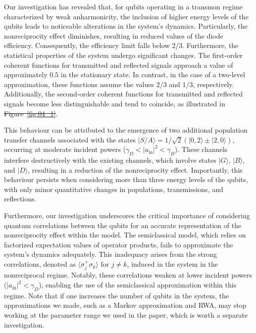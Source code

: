 \documentclass[lettersize,journal]{IEEEtran}
\providecommand{\DIFaddtex}[1]{{\protect\color{blue}\uwave{#1}}} %
\providecommand{\DIFdeltex}[1]{{\protect\color{red}\sout{#1}}}                      %
\providecommand{\DIFaddbegin}{} %
\providecommand{\DIFaddend}{} %
\providecommand{\DIFdelbegin}{} %
\providecommand{\DIFdelend}{} %
\providecommand{\DIFadd}[1]{\texorpdfstring{\DIFaddtex{#1}}{#1}} %
\providecommand{\DIFdel}[1]{\texorpdfstring{\DIFdeltex{#1}}{}} %
\newcommand{\DIFscaledelfig}{0.5}
\newlength{\DIFdelgraphicswidth} %
\newlength{\DIFdelgraphicsheight} %
\newcommand{\DIFaddincludegraphics}[2][]{{\color{blue}\fbox{\DIFOincludegraphics[#1]{#2}}}} %
\newcommand{\DIFdelincludegraphics}[2][]{%
\sbox{\DIFdelgraphicsbox}{\DIFOincludegraphics[#1]{#2}}%
\settoboxwidth{\DIFdelgraphicswidth}{\DIFdelgraphicsbox} %
\settoboxtotalheight{\DIFdelgraphicsheight}{\DIFdelgraphicsbox} %
\scalebox{\DIFscaledelfig}{%
\parbox[b]{\DIFdelgraphicswidth}{\usebox{\DIFdelgraphicsbox}\\[-\baselineskip] \rule{\DIFdelgraphicswidth}{0em}}\llap{\resizebox{\DIFdelgraphicswidth}{\DIFdelgraphicsheight}{%
\setlength{\unitlength}{\DIFdelgraphicswidth}%
\begin{picture}(1,1)%
\thicklines\linethickness{2pt} %
{\color[rgb]{1,0,0}\put(0,0){\framebox(1,1){}}}%
{\color[rgb]{1,0,0}\put(0,0){\line( 1,1){1}}}%
{\color[rgb]{1,0,0}\put(0,1){\line(1,-1){1}}}%
\end{picture}%
}\hspace*{3pt}}} %
} %
\DeclareRobustCommand{\DIFaddbegin}{\DIFOaddbegin \let\includegraphics\DIFaddincludegraphics} %
\DeclareRobustCommand{\DIFaddend}{\DIFOaddend \let\includegraphics\DIFOincludegraphics} %
\DeclareRobustCommand{\DIFdelbegin}{\DIFOdelbegin \let\includegraphics\DIFdelincludegraphics} %
\DeclareRobustCommand{\DIFdelend}{\DIFOaddend \let\includegraphics\DIFOincludegraphics} %
\begin{document}
Our investigation has revealed that, for qubits operating in a transmon regime characterized by weak anharmonicity, the inclusion of higher energy levels of the qubits leads to noticeable alterations in the system's dynamics. 
Particularly, the nonreciprocity effect diminishes, resulting in reduced values of the diode efficiency. 
Consequently, the efficiency limit falls below $2/3$. 
Furthermore, the statistical properties of the system undergo significant changes. 
The first-order coherent functions for transmitted and reflected signals approach a value of approximately $0.5$ in the stationary state. 
In contrast, in the case of a two-level approximation, these functions assume the values $2/3$ and $1/3$, respectively. 
Additionally, the second-order coherent functions for transmitted and reflected signals become less distinguishable and tend to coincide, as illustrated in \DIFdelbegin \DIFdel{Figure~\ref{fig:04_1}}\DIFdelend \DIFaddbegin \DIFadd{Fig.~\ref{fig:06}}\DIFaddend .

This behaviour can be attributed to the emergence of two additional population transfer channels associated with the states $|S/A\rangle = 1/\sqrt{2} \left( |0,2\rangle \pm |2,0\rangle \right)$, occurring at moderate incident powers ($\gamma_D < |a_\mathrm{in}|^2 < \gamma_B$). 
These channels interfere destructively with the existing channels, which involve states $|G\rangle$, $|B\rangle$, and $|D\rangle$, resulting in a reduction of the nonreciprocity effect. 
Importantly, this behaviour persists when considering more than three energy levels of the qubits, with only minor quantitative changes in populations, transmissions, and reflections.

Furthermore, our investigation underscores the critical importance of considering quantum correlations between the qubits for an accurate representation of the nonreciprocity effect within the model. 
The semiclassical model, which relies on factorized expectation values of operator products, fails to approximate the system's dynamics adequately. 
This inadequacy arises from the strong correlations, denoted as $\langle \sigma_j^+ \sigma_k \rangle$ for $j\neq k$, induced in the system in the nonreciprocal regime. 
Notably, these correlations weaken at lower incident powers ($|a_\mathrm{in}|^2 < \gamma_D$), enabling the use of the semiclassical approximation within this regime.
Note that if one increases the number of qubits in the system, the approximations we made, such as a Markov approximation and RWA, may stop working at the parameter range we used in the paper, which is worth a separate investigation.
\end{document}
